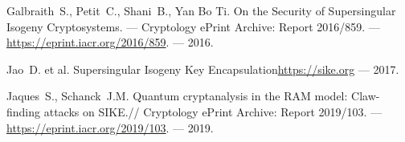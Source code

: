 \documentclass[a4paper,12pt]{article}
\theoremstyle{definition}
\begin{document}
\begin{thebibliography}{1}
  


Galbraith~S., Petit~C.,  Shani~B., Yan Bo Ti.
\newblock
On the Security of Supersingular Isogeny Cryptosystems. --- 
Cryptology ePrint Archive: Report 2016/859. --- \newblock \url{https://eprint.iacr.org/2016/859}. --- 2016.

  

  Jao~D. et al. \newblock Supersingular Isogeny Key Encapsulation\newblock \url{https://sike.org} --- 2017.


Jaques~S.,  Schanck~J.M.
\newblock Quantum cryptanalysis in the RAM model: Claw-finding attacks on SIKE.//
 Cryptology ePrint Archive: Report 2019/103. ---  \newblock \url{https://eprint.iacr.org/2019/103}. --- 2019.

 
 

 



\end{thebibliography}
\end{document}

